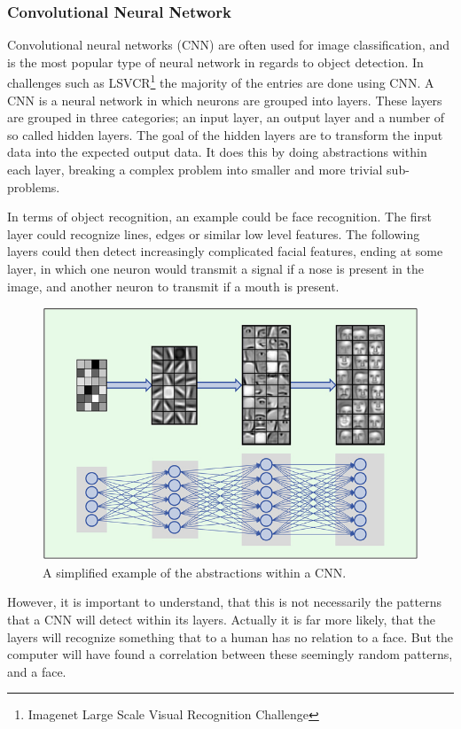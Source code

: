 \subsubsection{Convolutional Neural Network}
Convolutional neural networks (CNN) are often used for image classification, and is the most popular type of neural network in regards to object detection.
In challenges such as LSVCR\footnote{Imagenet Large Scale Visual Recognition Challenge} the majority of the entries are done using CNN\cite{ILSVRC_Results}.  
A CNN is a neural network in which neurons are grouped into layers.
These layers are grouped in three categories; an input layer, an output layer and a number of so called hidden layers.
The goal of the hidden layers are to transform the input data into the expected output data.
It does this by doing abstractions within each layer, breaking a complex problem into smaller and more trivial sub-problems.

In terms of object recognition, an example could be face recognition.
The first layer could recognize lines, edges or similar low level features.
The following layers could then detect increasingly complicated facial features, ending at some layer, in which one neuron would transmit a signal if a nose is present in the image, and another neuron to transmit if a mouth is present.


\begin{figure}[H]
	\centering
	\includegraphics[scale=0.40]{images/cnn_face.jpg}
	\caption{
		A simplified example of the abstractions within a CNN.
	}
	\label{fig:face_cnn}
\end{figure}
 
However, it is important to understand, that this is not necessarily the patterns that a CNN will detect within its layers.
Actually it is far more likely, that the layers will recognize something that to a human has no relation to a face.
But the computer will have found a correlation between these seemingly random patterns, and a face.

